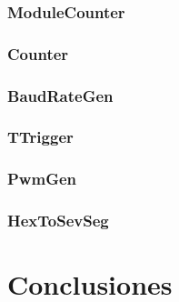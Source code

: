 \documentclass[12pt]{article}
\begin{document}
\subsubsection{ModuleCounter}
\subsubsection{Counter}
\subsubsection{BaudRateGen}
\subsubsection{TTrigger}
\subsubsection{PwmGen}
\subsubsection{HexToSevSeg}


\section{Conclusiones}
\end{document}
